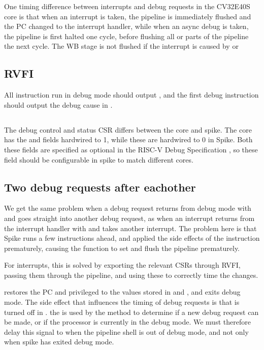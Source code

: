 One timing difference between interrupts and debug requests in the CV32E40S core is that when an interrupt is taken, the pipeline is immediately flushed and the PC changed to the interrupt handler, while when an async debug is taken, the pipeline is first halted one cycle, before flushing all or parts of the pipeline the next cycle. The WB stage is not flushed if the interrupt is caused by  or 


\subsection{RVFI}

All instruction run in debug mode should output , and the first debug instruction should output the debug cause in  \cite{openhwgroupRISCVFormalInterface2023}.


\subsection{}

The  debug control and status CSR differs between the core and spike. The core has the  and  fields hardwired to 1, while these are hardwired to 0 in Spike. Both these fields are specified as optional in the RISC-V Debug Specification \cite{pauldonahueRISCVDebugSupport2023}, so these field should be configurable in spike to match different cores.



\subsection{Two debug requests after eachother}

We get the same problem when a debug request returns from debug mode with  and goes straight into another debug request, as when an interrupt returns from the interrupt handler with  and takes another interrupt. The problem here is that Spike runs a few instructions ahead, and applied the side effects of the  instruction prematurely, causing the  function to set  and flush the pipeline prematurely.

For interrupts, this is solved by exporting the relevant CSRs through RVFI, passing them through the pipeline, and using these to correctly time the changes.

 restores the PC and privileged to the values stored in  and , and exits debug mode. The side effect that influences the timing of debug requests is that  is turned off in . the  is used by the  method to determine if a new debug request can be made, or if the processor is currently in the debug mode. We must therefore delay this signal to when the pipeline shell is out of debug mode, and not only when spike has exited debug mode. 

